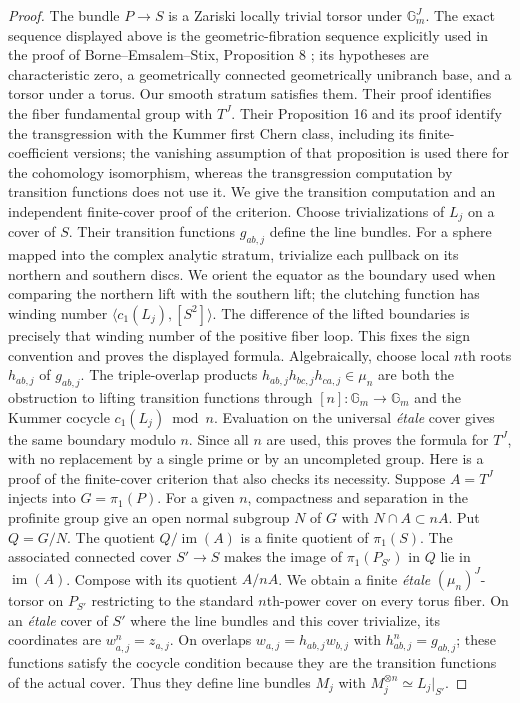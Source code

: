 \begin{proof}
The bundle $P\to S$ is a Zariski locally trivial torsor under $\mathbb G_m^J$. The exact sequence displayed above is the geometric-fibration sequence explicitly used in the proof of Borne--Emsalem--Stix, Proposition 8 \cite{DE_BES}; its hypotheses are characteristic zero, a geometrically connected geometrically unibranch base, and a torsor under a torus. Our smooth stratum satisfies them. Their proof identifies the fiber fundamental group with $T^J$. Their Proposition 16 and its proof identify the transgression with the Kummer first Chern class, including its finite-coefficient versions; the vanishing assumption of that proposition is used there for the cohomology isomorphism, whereas the transgression computation by transition functions does not use it. We give the transition computation and an independent finite-cover proof of the criterion.
Choose trivializations of $L_j$ on a cover of $S$. Their transition functions $g_{ab,j}$ define the line bundles. For a sphere mapped into the complex analytic stratum, trivialize each pullback on its northern and southern discs. We orient the equator as the boundary used when comparing the northern lift with the southern lift; the clutching function has winding number $\langle c_1(L_j),[S^2]\rangle$. The difference of the lifted boundaries is precisely that winding number of the positive fiber loop. This fixes the sign convention and proves the displayed formula. Algebraically, choose local $n$th roots $h_{ab,j}$ of $g_{ab,j}$. The triple-overlap products $h_{ab,j}h_{bc,j}h_{ca,j}\in\mu_n$ are both the obstruction to lifting transition functions through $[n]:\mathbb G_m\to\mathbb G_m$ and the Kummer cocycle $c_1(L_j)\bmod n$. Evaluation on the universal \emph{\'etale} cover gives the same boundary modulo $n$. Since all $n$ are used, this proves the formula for $T^J$, with no replacement by a single prime or by an uncompleted group.
Here is a proof of the finite-cover criterion that also checks its necessity. Suppose $A=T^J$ injects into $G=\pi_1(P)$. For a given $n$, compactness and separation in the profinite group give an open normal subgroup $N$ of $G$ with $N\cap A\subset nA$. Put $Q=G/N$. The quotient $Q/\operatorname{im}(A)$ is a finite quotient of $\pi_1(S)$. The associated connected cover $S'\to S$ makes the image of $\pi_1(P_{S'})$ in $Q$ lie in $\operatorname{im}(A)$. Compose with its quotient $A/nA$. We obtain a finite \emph{\'etale} $(\mu_n)^J$-torsor on $P_{S'}$ restricting to the standard $n$th-power cover on every torus fiber. On an \emph{\'etale} cover of $S'$ where the line bundles and this cover trivialize, its coordinates are $w_{a,j}^n=z_{a,j}$. On overlaps $w_{a,j}=h_{ab,j}w_{b,j}$ with $h_{ab,j}^n=g_{ab,j}$; these functions satisfy the cocycle condition because they are the transition functions of the actual cover. Thus they define line bundles $M_j$ with $M_j^{\otimes n}\simeq L_j|_{S'}$.

\end{proof}
